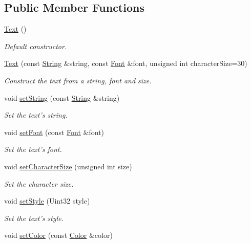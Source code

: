 \subsection*{Public Member Functions}
\begin{DoxyCompactItemize}
\item 
\hyperlink{classsf_1_1_text_aff7cab6a92e5948c9d1481cb2d87eb84}{Text} ()
\begin{DoxyCompactList}\small\item\em Default constructor. \end{DoxyCompactList}\item 
\hyperlink{classsf_1_1_text_a614019e0b5c0ed39a99d32483a51f2c5}{Text} (const \hyperlink{classsf_1_1_string}{String} \&string, const \hyperlink{classsf_1_1_font}{Font} \&font, unsigned int character\+Size=30)
\begin{DoxyCompactList}\small\item\em Construct the text from a string, font and size. \end{DoxyCompactList}\item 
void \hyperlink{classsf_1_1_text_a7d3b3359f286fd9503d1ced25b7b6c33}{set\+String} (const \hyperlink{classsf_1_1_string}{String} \&string)
\begin{DoxyCompactList}\small\item\em Set the text's string. \end{DoxyCompactList}\item 
void \hyperlink{classsf_1_1_text_a2927805d1ae92d57f15034ea34756b81}{set\+Font} (const \hyperlink{classsf_1_1_font}{Font} \&font)
\begin{DoxyCompactList}\small\item\em Set the text's font. \end{DoxyCompactList}\item 
void \hyperlink{classsf_1_1_text_ae96f835fc1bff858f8a23c5b01eaaf7e}{set\+Character\+Size} (unsigned int size)
\begin{DoxyCompactList}\small\item\em Set the character size. \end{DoxyCompactList}\item 
void \hyperlink{classsf_1_1_text_ad791702bc2d1b6590a1719aa60635edf}{set\+Style} (Uint32 style)
\begin{DoxyCompactList}\small\item\em Set the text's style. \end{DoxyCompactList}\item 
void \hyperlink{classsf_1_1_text_afd1742fca1adb6b0ea98357250ffb634}{set\+Color} (const \hyperlink{classsf_1_1_color}{Color} \&color)

\end{DoxyCompactItemize}
